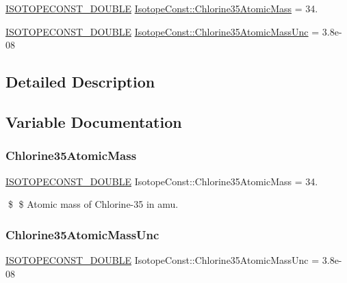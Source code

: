 \begin{DoxyCompactItemize}
\item 
\mbox{\hyperlink{group___isotope_const-_macros_ga8f45a7272ce02c0b4c65c44636ed719a}{I\+S\+O\+T\+O\+P\+E\+C\+O\+N\+S\+T\+\_\+\+D\+O\+U\+B\+LE}} \mbox{\hyperlink{group___isotope_const-_chlorine-_cl35_ga96e81adb7b9a453695ffe9580e2cad83}{Isotope\+Const\+::\+Chlorine35\+Atomic\+Mass}} = 34.
\item 
\mbox{\hyperlink{group___isotope_const-_macros_ga8f45a7272ce02c0b4c65c44636ed719a}{I\+S\+O\+T\+O\+P\+E\+C\+O\+N\+S\+T\+\_\+\+D\+O\+U\+B\+LE}} \mbox{\hyperlink{group___isotope_const-_chlorine-_cl35_ga206efdd0293080fdeef2b467fcd20248}{Isotope\+Const\+::\+Chlorine35\+Atomic\+Mass\+Unc}} = 3.\+8e-\/08
\end{DoxyCompactItemize}


\subsection{Detailed Description}


\subsection{Variable Documentation}
\mbox{\label{group___isotope_const-_chlorine-_cl35_ga96e81adb7b9a453695ffe9580e2cad83}} 
\subsubsection{\texorpdfstring{Chlorine35\+Atomic\+Mass}{Chlorine35AtomicMass}}
{\footnotesize\ttfamily \mbox{\hyperlink{group___isotope_const-_macros_ga8f45a7272ce02c0b4c65c44636ed719a}{I\+S\+O\+T\+O\+P\+E\+C\+O\+N\+S\+T\+\_\+\+D\+O\+U\+B\+LE}} Isotope\+Const\+::\+Chlorine35\+Atomic\+Mass = 34.}

\$ \$ Atomic mass of Chlorine-\/35 in amu. \mbox{\label{group___isotope_const-_chlorine-_cl35_ga206efdd0293080fdeef2b467fcd20248}} 
\subsubsection{\texorpdfstring{Chlorine35\+Atomic\+Mass\+Unc}{Chlorine35AtomicMassUnc}}
{\footnotesize\ttfamily \mbox{\hyperlink{group___isotope_const-_macros_ga8f45a7272ce02c0b4c65c44636ed719a}{I\+S\+O\+T\+O\+P\+E\+C\+O\+N\+S\+T\+\_\+\+D\+O\+U\+B\+LE}} Isotope\+Const\+::\+Chlorine35\+Atomic\+Mass\+Unc = 3.\+8e-\/08}

